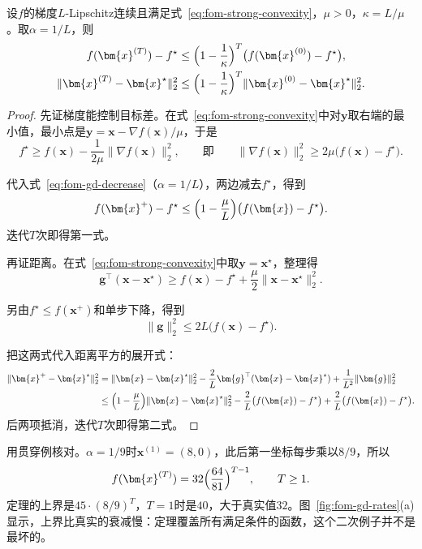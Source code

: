 \begin{theorem}[强凸情形的梯度下降]
\label{thm:fom-gd-strong}
设$f$的梯度$L$-Lipschitz连续且满足式~\eqref{eq:fom-strong-convexity}，$\mu>0$，$\kappa=L/\mu$。取$\alpha=1/L$，则
\begin{equation}
 \begin{aligned}
 f(\bm{x}^{(T)})-f^\star&\leq\Bigl(1-\frac1\kappa\Bigr)^T\bigl(f(\bm{x}^{(0)})-f^\star\bigr),\\
 \lVert\bm{x}^{(T)}-\bm{x}^\star\rVert_2^2&\leq\Bigl(1-\frac1\kappa\Bigr)^T\lVert\bm{x}^{(0)}-\bm{x}^\star\rVert_2^2.
 \end{aligned}
 \label{eq:fom-gd-strong}
\end{equation}
\end{theorem}

\begin{proof}
先证梯度能控制目标差。在式~\eqref{eq:fom-strong-convexity}中对$\bm{y}$取右端的最小值，最小点是$\bm{y}=\bm{x}-\nabla f(\bm{x})/\mu$，于是
\[
 f^\star\geq f(\bm{x})-\frac{1}{2\mu}\lVert\nabla f(\bm{x})\rVert_2^2,
 \qquad\text{即}\qquad
 \lVert\nabla f(\bm{x})\rVert_2^2\geq2\mu\bigl(f(\bm{x})-f^\star\bigr).
\]

代入式~\eqref{eq:fom-gd-decrease}（$\alpha=1/L$），两边减去$f^\star$，得到
\[
 f(\bm{x}^+)-f^\star\leq\Bigl(1-\frac\mu L\Bigr)\bigl(f(\bm{x})-f^\star\bigr).
\]
迭代$T$次即得第一式。

再证距离。在式~\eqref{eq:fom-strong-convexity}中取$\bm{y}=\bm{x}^\star$，整理得
\[
 \bm{g}^\top(\bm{x}-\bm{x}^\star)\geq f(\bm{x})-f^\star+\frac\mu2\lVert\bm{x}-\bm{x}^\star\rVert_2^2.
\]

另由$f^\star\leq f(\bm{x}^+)$和单步下降，得到
\[
 \lVert\bm{g}\rVert_2^2\leq2L\bigl(f(\bm{x})-f^\star\bigr).
\]

把这两式代入距离平方的展开式：
\[
 \begin{aligned}
 \lVert\bm{x}^+-\bm{x}^\star\rVert_2^2
 &=\lVert\bm{x}-\bm{x}^\star\rVert_2^2-\frac2L\bm{g}^\top(\bm{x}-\bm{x}^\star)+\frac{1}{L^2}\lVert\bm{g}\rVert_2^2\\
 &\leq\Bigl(1-\frac\mu L\Bigr)\lVert\bm{x}-\bm{x}^\star\rVert_2^2-\frac2L\bigl(f(\bm{x})-f^\star\bigr)+\frac2L\bigl(f(\bm{x})-f^\star\bigr).
 \end{aligned}
\]
后两项抵消，迭代$T$次即得第二式。
\end{proof}

用贯穿例核对。$\alpha=1/9$时$\bm{x}^{(1)}=(8,0)$，此后第一坐标每步乘以$8/9$，所以
\[
 f(\bm{x}^{(T)})=32\Bigl(\frac{64}{81}\Bigr)^{T-1},\qquad T\geq1.
\]
定理的上界是$45\cdot(8/9)^T$，$T=1$时是$40$，大于真实值$32$。图~\ref{fig:fom-gd-rates}(a)显示，上界比真实的衰减慢：定理覆盖所有满足条件的函数，这个二次例子并不是最坏的。


